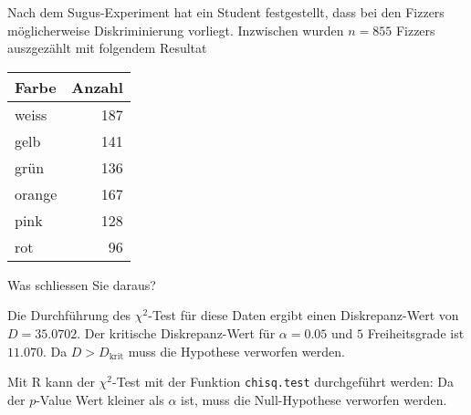 Nach dem Sugus-Experiment hat ein Student festgestellt, dass bei den
Fizzers möglicherweise Diskriminierung vorliegt. Inzwischen wurden
$n=855$ Fizzers auszgezählt mit folgendem Resultat
\begin{center}
\begin{tabular}{|l|r|}
\hline
Farbe&Anzahl\\
\hline
weiss&187\\
gelb&141\\
grün&136\\
orange&167\\
pink&128\\
rot&96\\
\hline
\end{tabular}
\end{center}
Was schliessen Sie daraus?


\begin{loesung}
Die Durchführung des $\chi^2$-Test für diese Daten ergibt
einen Diskrepanz-Wert von $D=35.0702$. Der kritische Diskrepanz-Wert
für $\alpha = 0.05$ und $5$ Freiheitsgrade ist $11.070$. Da
$D>D_{\text{krit}}$ muss die Hypothese verworfen werden.

Mit R kann der $\chi^2$-Test mit der Funktion {\tt chisq.test} durchgeführt
werden:
Da der $p$-Value Wert kleiner als $\alpha$ ist, muss die
Null-Hypothese verworfen werden.
\end{loesung}
